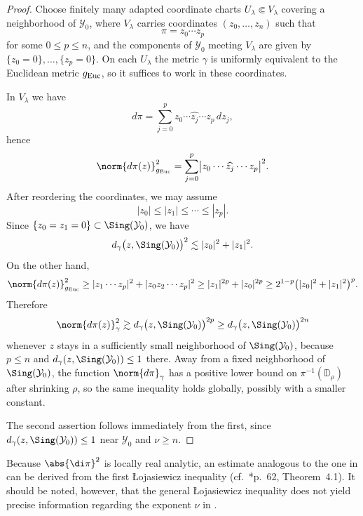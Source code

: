 \documentclass[12pt]{amsart}
\begin{document}
\begin{proof}
Choose finitely many adapted coordinate charts \(U_{\lambda} \Subset V_{\lambda}\) covering a neighborhood
of \(\mathcal{Y}_{0}\), where \(V_{\lambda}\) carries coordinates
\((z_{0},\dots,z_{n})\) such that
\[
\pi = z_{0} \cdots z_{p}
\]
for some \(0 \le p \le n\), and the components of \(\mathcal{Y}_{0}\) meeting \(V_{\lambda}\) are given by
\(\{ z_{0} = 0 \}, \dots, \{ z_{p} = 0 \}\). On each \(U_{\lambda}\) the metric \(\gamma\) is uniformly
equivalent to the Euclidean metric \(g_{\rm Euc}\), so it suffices to work in these coordinates.

In \(V_{\lambda}\) we have
\[
d\pi = \sum_{j=0}^{p} z_{0} \cdots \widehat{z_{j}} \cdots z_{p}\, dz_{j},
\]
hence
\[
\norm{d\pi(z)}_{g_{\rm Euc}}^{2}
=
\sum_{j=0}^{p} \bigl| z_{0} \cdots \widehat{z_{j}} \cdots z_{p} \bigr|^{2}.
\]
After reordering the coordinates, we may assume
\[
|z_{0}| \le |z_{1}| \le \cdots \le |z_{p}|.
\]
Since \(\{ z_{0} = z_{1} = 0 \} \subset \Sing(\mathcal{Y}_{0})\), we have
\[
d_{\gamma}\bigl(z,\Sing(\mathcal{Y}_{0})\bigr)^{2}
\lesssim
|z_{0}|^{2} + |z_{1}|^{2}.
\]
On the other hand,
\[
\norm{d\pi(z)}_{g_{\rm Euc}}^{2}
\ge
|z_{1} \cdots z_{p}|^{2} + |z_{0} z_{2} \cdots z_{p}|^{2}
\ge
|z_{1}|^{2p} + |z_{0}|^{2p}
\ge
2^{1-p}\bigl(|z_{0}|^{2} + |z_{1}|^{2}\bigr)^{p}.
\]
Therefore
\[
\norm{d\pi(z)}_{\gamma}^{2}
\gtrsim
d_{\gamma}\bigl(z,\Sing(\mathcal{Y}_{0})\bigr)^{2p}
\ge
d_{\gamma}\bigl(z,\Sing(\mathcal{Y}_{0})\bigr)^{2n}
\]
whenever \(z\) stays in a sufficiently small neighborhood of \(\Sing(\mathcal{Y}_{0})\), because \(p \le n\)
and \(d_{\gamma}(z,\Sing(\mathcal{Y}_{0})) \le 1\) there. Away from a fixed neighborhood of
\(\Sing(\mathcal{Y}_{0})\), the function \(\norm{d\pi}_{\gamma}\) has a positive lower bound on
\(\pi^{-1}(\mathbb{D}_{\rho})\) after shrinking \(\rho\), so the same inequality holds globally, possibly
with a smaller constant.

The second assertion follows immediately from the first, since
\(d_{\gamma}(z,\Sing(\mathcal{Y}_{0})) \le 1\) near \(\mathcal{Y}_{0}\) and \(\nu \ge n\).
\end{proof}

\begin{remark}
    Because $\abs{\di \pi}^2$ is locally real analytic, an estimate analogous to the one in  can be derived from the first Łojasiewicz inequality (cf.\ \cite{malgrange1966ideals}*{p.~62, Theorem~4.1}). It should be noted, however, that the general Łojasiewicz inequality does {not} yield precise information regarding the exponent $\nu$ in .
\end{remark}
\end{document}
